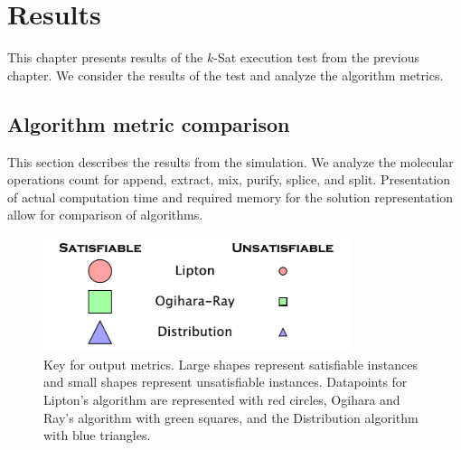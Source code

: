 \chapter{Results}

This chapter presents results of the $k$-{\sc Sat} execution test from the previous chapter.  We consider the results of the test and analyze the algorithm metrics.  

	\section{Algorithm metric comparison}
	
This section describes the results from the simulation.  We analyze the molecular operations count for append, extract, mix, purify, splice, and split.  Presentation of actual computation time and required memory for the solution representation allow for comparison of algorithms.

\begin{figure}[htdp]

\begin{center}

\includegraphics[width=0.8\textwidth]{./figures/key.pdf}

\caption{Key for output metrics.  Large shapes represent satisfiable instances and small shapes represent unsatisfiable instances.  Datapoints for Lipton's algorithm are represented with red circles, Ogihara and Ray's algorithm with green squares, and the Distribution algorithm with blue triangles. }
\label{metricKey}
\end{center}
\end{figure}
\FloatBarrier

